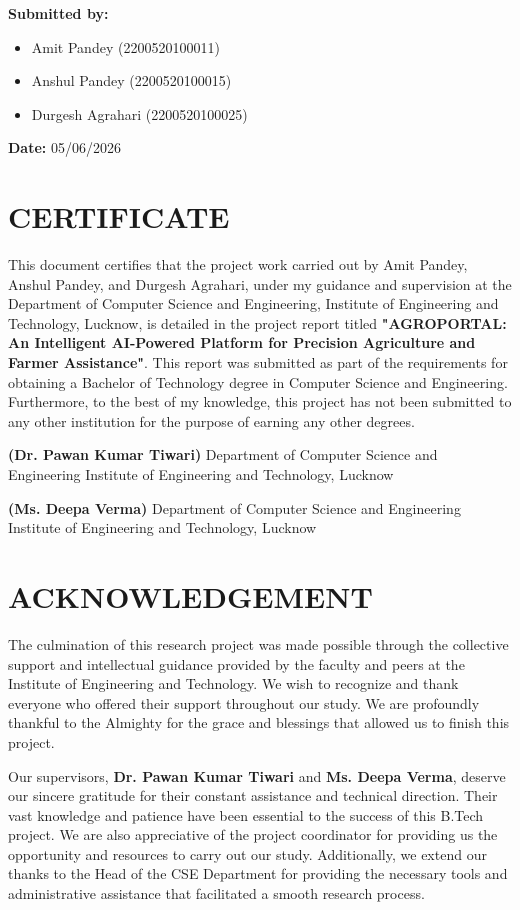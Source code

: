\documentclass[12pt,a4paper]{report}
\begin{document}
\textbf{Submitted by:}

\begin{itemize}
\item Amit Pandey (2200520100011)
\item Anshul Pandey (2200520100015)
\item Durgesh Agrahari (2200520100025)
\end{itemize}
\textbf{Date:} 05/06/2026

\newpage

\section{CERTIFICATE}

This document certifies that the project work carried out by Amit Pandey, Anshul Pandey, and Durgesh Agrahari, under my guidance and supervision at the Department of Computer Science and Engineering, Institute of Engineering and Technology, Lucknow, is detailed in the project report titled \textbf{"AGROPORTAL: An Intelligent AI-Powered Platform for Precision Agriculture and Farmer Assistance"}. This report was submitted as part of the requirements for obtaining a Bachelor of Technology degree in Computer Science and Engineering. Furthermore, to the best of my knowledge, this project has not been submitted to any other institution for the purpose of earning any other degrees.

\textbf{(Dr. Pawan Kumar Tiwari)}
Department of Computer Science and Engineering
Institute of Engineering and Technology, Lucknow

\textbf{(Ms. Deepa Verma)}
Department of Computer Science and Engineering
Institute of Engineering and Technology, Lucknow

\newpage

\section{ACKNOWLEDGEMENT}

The culmination of this research project was made possible through the collective support and intellectual guidance provided by the faculty and peers at the Institute of Engineering and Technology. We wish to recognize and thank everyone who offered their support throughout our study. We are profoundly thankful to the Almighty for the grace and blessings that allowed us to finish this project.

Our supervisors, \textbf{Dr. Pawan Kumar Tiwari} and \textbf{Ms. Deepa Verma}, deserve our sincere gratitude for their constant assistance and technical direction. Their vast knowledge and patience have been essential to the success of this B.Tech project. We are also appreciative of the project coordinator for providing us the opportunity and resources to carry out our study. Additionally, we extend our thanks to the Head of the CSE Department for providing the necessary tools and administrative assistance that facilitated a smooth research process.
\end{document}

